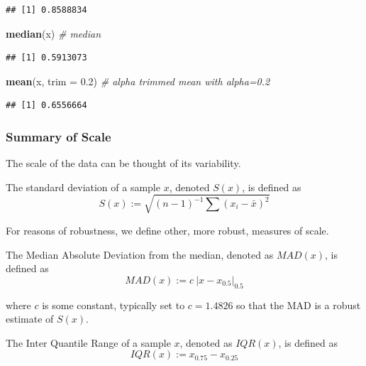 \documentclass[]{book}
\newenvironment{Shaded}{\begin{snugshade}}{\end{snugshade}}
\newcommand{\KeywordTok}[1]{\textcolor[rgb]{0.13,0.29,0.53}{\textbf{{#1}}}}
\newcommand{\DataTypeTok}[1]{\textcolor[rgb]{0.13,0.29,0.53}{{#1}}}
\newcommand{\FloatTok}[1]{\textcolor[rgb]{0.00,0.00,0.81}{{#1}}}
\newcommand{\CommentTok}[1]{\textcolor[rgb]{0.56,0.35,0.01}{\textit{{#1}}}}
\newcommand{\NormalTok}[1]{{#1}}
\theoremstyle{definition}
\theoremstyle{definition}
\theoremstyle{remark}
\let\BeginKnitrBlock\begin \let\EndKnitrBlock\end
\begin{document}
\begin{verbatim}
## [1] 0.8588834
\end{verbatim}

\begin{Shaded}
\begin{Highlighting}[]
\KeywordTok{median}\NormalTok{(x) }\CommentTok{# median}
\end{Highlighting}
\end{Shaded}

\begin{verbatim}
## [1] 0.5913073
\end{verbatim}

\begin{Shaded}
\begin{Highlighting}[]
\KeywordTok{mean}\NormalTok{(x, }\DataTypeTok{trim =} \FloatTok{0.2}\NormalTok{) }\CommentTok{# alpha trimmed mean with alpha=0.2}
\end{Highlighting}
\end{Shaded}

\begin{verbatim}
## [1] 0.6556664
\end{verbatim}

\subsubsection{Summary of Scale}\label{summary-of-scale}

The scale of the data can be thought of its variability.

\BeginKnitrBlock{definition}
\protect\hypertarget{def:unnamed-chunk-69}{}{\label{def:unnamed-chunk-69}}The
standard deviation of a sample \(x\), denoted \(S(x)\), is defined as
\[ S(x):=\sqrt{(n-1)^{-1} \sum (x_i-\bar x)^2} \]
\EndKnitrBlock{definition}

For reasons of robustness, we define other, more robust, measures of
scale.

\BeginKnitrBlock{definition}
\protect\hypertarget{def:unnamed-chunk-70}{}{\label{def:unnamed-chunk-70}}The
Median Absolute Deviation from the median, denoted as \(MAD(x)\), is
defined as \[MAD(x):= c \: |x-x_{0.5}|_{0.5} \]
\EndKnitrBlock{definition}

where \(c\) is some constant, typically set to \(c=1.4826\) so that the
MAD is a robust estimate of \(S(x)\).

\BeginKnitrBlock{definition}
\protect\hypertarget{def:unnamed-chunk-71}{}{\label{def:unnamed-chunk-71}}The
Inter Quantile Range of a sample \(x\), denoted as \(IQR(x)\), is
defined as \[ IQR(x):= x_{0.75}-x_{0.25} \]
\EndKnitrBlock{definition}
\end{document}
